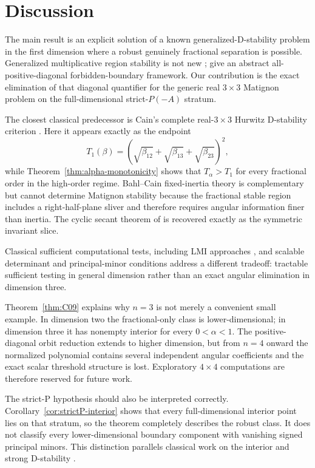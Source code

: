 \section{Discussion}
\label{sec:discussion}

The main result is an explicit solution of a known generalized-D-stability problem in the first dimension where a robust genuinely fractional separation is possible. Generalized multiplicative region stability is not new \citep{Kushel2019}; \cite{KushelPavani2022} give an abstract all-positive-diagonal forbidden-boundary framework. Our contribution is the exact elimination of that diagonal quantifier for the generic real \(3\times3\) Matignon problem on the full-dimensional strict-\(P(-A)\) stratum.

The closest classical predecessor is Cain's complete real-\(3\times3\) Hurwitz D-stability criterion \citep{Cain1976}. Here it appears exactly as the endpoint
\[
T_1(\beta)
=
\left(
\sqrt{\beta_{12}}+
\sqrt{\beta_{13}}+
\sqrt{\beta_{23}}
\right)^2,
\]
while Theorem~\ref{thm:alpha-monotonicity} shows that \(T_\alpha>T_1\) for every fractional order in the high-order regime. Bahl--Cain fixed-inertia theory \citep{BahlCain1977} is complementary but cannot determine Matignon stability because the fractional stable region includes a right-half-plane sliver and therefore requires angular information finer than inertia. The cyclic secant theorem of \cite{Siami2021} is recovered exactly as the symmetric invariant slice.

Classical sufficient computational tests, including LMI approaches \citep{OliveiraPeres2004}, and scalable determinant and principal-minor conditions \citep{Kushel2023,Kushel2026} address a different tradeoff: tractable sufficient testing in general dimension rather than an exact angular elimination in dimension three.

Theorem~\ref{thm:C09} explains why \(n=3\) is not merely a convenient small example. In dimension two the fractional-only class is lower-dimensional; in dimension three it has nonempty interior for every \(0<\alpha<1\). The positive-diagonal orbit reduction extends to higher dimension, but from \(n=4\) onward the normalized polynomial contains several independent angular coefficients and the exact scalar threshold structure is lost. Exploratory \(4\times4\) computations are therefore reserved for future work.

The strict-P hypothesis should also be interpreted correctly. Corollary~\ref{cor:strictP-interior} shows that every full-dimensional interior point lies on that stratum, so the theorem completely describes the robust class. It does not classify every lower-dimensional boundary component with vanishing signed principal minors. This distinction parallels classical work on the interior and strong D-stability \citep{Hartfiel1980,Abed1986}.

